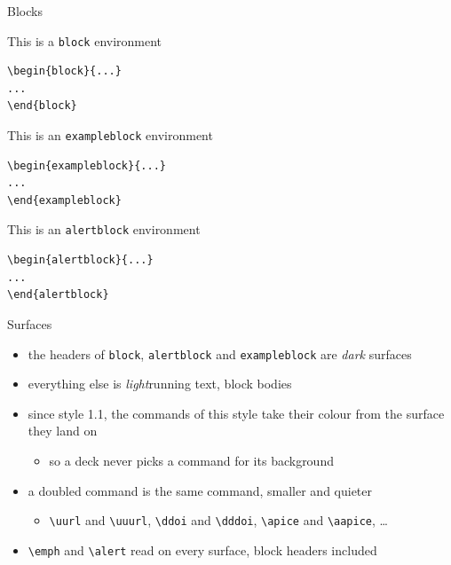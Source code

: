 \documentclass[presentation,cesena,apice]{beamer}\mode<presentation>{\usetheme{AMSCesena}}
\begin{document}
\begin{frame}[c,fragile]{Blocks}
%
\begin{block}{This is a \texttt{block} environment}
\begin{verbatim}
\begin{block}{...}
...
\end{block}
\end{verbatim}
\end{block}
%
\begin{exampleblock}{This is an \texttt{exampleblock} environment}
\begin{verbatim}
\begin{exampleblock}{...}
...
\end{exampleblock}
\end{verbatim}
\end{exampleblock}
%
\begin{alertblock}{This is an \texttt{alertblock} environment}
\begin{verbatim}
\begin{alertblock}{...}
...
\end{alertblock}
\end{verbatim}
\end{alertblock}
%
\end{frame}

\begin{frame}[c]{Surfaces}
%
\begin{itemize}
	\item the headers of \texttt{block}, \texttt{alertblock} and \texttt{exampleblock} are \emph{dark} surfaces
	\item everything else is \emph{light}\textemdash{}running text, block bodies
	\item since style 1.1, the commands of this style take their colour from the surface they land on
	\begin{itemize}
		\item so a deck never picks a command for its background
	\end{itemize}
	\item a doubled command is the same command, \alert{smaller and quieter}
	\begin{itemize}
		\item \texttt{\textbackslash{}uurl} and \texttt{\textbackslash{}uuurl}, \texttt{\textbackslash{}ddoi} and \texttt{\textbackslash{}dddoi}, \texttt{\textbackslash{}apice} and \texttt{\textbackslash{}aapice}, \ldots
	\end{itemize}
	\item \texttt{\textbackslash{}emph} and \texttt{\textbackslash{}alert} read on every surface, block headers included
\end{itemize}
%
\end{frame}
\end{document}
